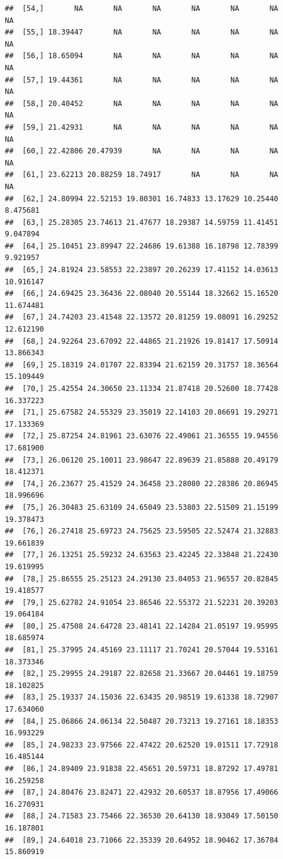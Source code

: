 \documentclass{article}\usepackage[]{graphicx}\usepackage[]{color}
\makeatletter
\newenvironment{kframe}{%
 \def\at@end@of@kframe{}%
 \ifinner\ifhmode%
  \def\at@end@of@kframe{\end{minipage}}%
  \begin{minipage}{\columnwidth}%
 \fi\fi%
 \def\FrameCommand##1{\hskip\@totalleftmargin \hskip-\fboxsep
 \colorbox{shadecolor}{##1}\hskip-\fboxsep
     \hskip-\linewidth \hskip-\@totalleftmargin \hskip\columnwidth}%
 \MakeFramed {\advance\hsize-\width
   \@totalleftmargin\z@ \linewidth\hsize
   \@setminipage}}%
 {\par\unskip\endMakeFramed%
 \at@end@of@kframe}
\newenvironment{knitrout}{}{} %
\makeatother
\begin{document}
\begin{knitrout}
\begin{kframe}
\begin{verbatim}
##  [54,]       NA       NA       NA       NA       NA       NA        NA
##  [55,] 18.39447       NA       NA       NA       NA       NA        NA
##  [56,] 18.65094       NA       NA       NA       NA       NA        NA
##  [57,] 19.44361       NA       NA       NA       NA       NA        NA
##  [58,] 20.40452       NA       NA       NA       NA       NA        NA
##  [59,] 21.42931       NA       NA       NA       NA       NA        NA
##  [60,] 22.42806 20.47939       NA       NA       NA       NA        NA
##  [61,] 23.62213 20.88259 18.74917       NA       NA       NA        NA
##  [62,] 24.80994 22.52153 19.80301 16.74833 13.17629 10.25440  8.475681
##  [63,] 25.28305 23.74613 21.47677 18.29387 14.59759 11.41451  9.047894
##  [64,] 25.10451 23.89947 22.24686 19.61388 16.18798 12.78399  9.921957
##  [65,] 24.81924 23.58553 22.23897 20.26239 17.41152 14.03613 10.916147
##  [66,] 24.69425 23.36436 22.08040 20.55144 18.32662 15.16520 11.674481
##  [67,] 24.74203 23.41548 22.13572 20.81259 19.08091 16.29252 12.612190
##  [68,] 24.92264 23.67092 22.44865 21.21926 19.81417 17.50914 13.866343
##  [69,] 25.18319 24.01707 22.83394 21.62159 20.31757 18.36564 15.109449
##  [70,] 25.42554 24.30650 23.11334 21.87418 20.52600 18.77428 16.337223
##  [71,] 25.67582 24.55329 23.35019 22.14103 20.86691 19.29271 17.133369
##  [72,] 25.87254 24.81961 23.63076 22.49061 21.36555 19.94556 17.681900
##  [73,] 26.06120 25.10011 23.98647 22.89639 21.85888 20.49179 18.412371
##  [74,] 26.23677 25.41529 24.36458 23.28080 22.28386 20.86945 18.996696
##  [75,] 26.30483 25.63109 24.65049 23.53803 22.51509 21.15199 19.378473
##  [76,] 26.27418 25.69723 24.75625 23.59505 22.52474 21.32883 19.661839
##  [77,] 26.13251 25.59232 24.63563 23.42245 22.33848 21.22430 19.619995
##  [78,] 25.86555 25.25123 24.29130 23.04053 21.96557 20.82845 19.418577
##  [79,] 25.62782 24.91054 23.86546 22.55372 21.52231 20.39203 19.064184
##  [80,] 25.47508 24.64728 23.48141 22.14284 21.05197 19.95995 18.685974
##  [81,] 25.37995 24.45169 23.11117 21.70241 20.57044 19.53161 18.373346
##  [82,] 25.29955 24.29187 22.82658 21.33667 20.04461 19.18759 18.102825
##  [83,] 25.19337 24.15036 22.63435 20.98519 19.61338 18.72907 17.634060
##  [84,] 25.06866 24.06134 22.50487 20.73213 19.27161 18.18353 16.993229
##  [85,] 24.98233 23.97566 22.47422 20.62520 19.01511 17.72918 16.485144
##  [86,] 24.89409 23.91838 22.45651 20.59731 18.87292 17.49781 16.259258
##  [87,] 24.80476 23.82471 22.42932 20.60537 18.87956 17.49066 16.270931
##  [88,] 24.71583 23.75466 22.36530 20.64130 18.93049 17.50150 16.187801
##  [89,] 24.64018 23.71066 22.35339 20.64952 18.90462 17.36784 15.860919

\end{verbatim}
\end{kframe}
\end{knitrout}
\end{document}
